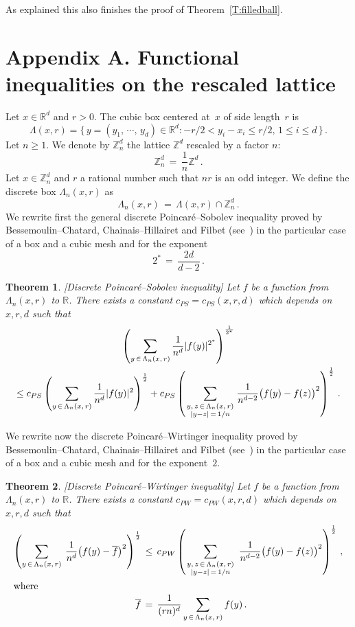 \documentclass[10pt]{amsart}
\newtheorem{theo}{Theorem}[section]
\theoremstyle{definition}\newtheorem{defi}[theo]{Definition}\newtheorem{rema}[theo]{Remark}\newtheorem{exam}[theo]{Example}\newtheorem{exem}[theo]{Example}\newtheorem{nota}[theo]{Notation}
\newcommand{\tatop}[2]{\genfrac{}{}{0pt}{1}{#1}{#2}}
\newcommand*\Z {{\mathbb Z}}
\newcommand*\Zd {{\mathbb Z^d}}
\newcommand*\Rd {{\mathbb R^d}}
\newcommand*\Znd {{\mathbb Z_n^d}}
\newcommand*\R{\mathbb{R}}
\newcommand*\baf {{\overline f}}
\newcommand*\La {{\Lambda}}
\begin{document}
As explained this also finishes the proof of Theorem~\ref{T:filledball}.



\appendix
\addtocounter{section}{1}
\section*{Appendix A. Functional inequalities on the rescaled lattice}
Let $x\in\Rd$ and $r>0$. The cubic box centered at~$x$ of side length~$r$ is
\[
\Lambda(x,r) = \big\{\,y=(y_1,\,\cdots,\,y_d)\in\R^d: -r/2<y_i-x_i\leq r/2,
\,1\leq i\leq d\,\big\}\,.
\]
Let $n\geq 1$. We denote by $\Znd$ the lattice $\Zd$ rescaled by a factor $n$:
\[
\Znd\,=\,\frac{1}{n}\Z^d\,.
\]
Let $x\in\Znd$ and $r$ a rational number such that $nr$ is an odd integer. We define the discrete box $\La_n(x,r)$ as
\[
\La_n(x,r)\,=\,\La(x,r)\cap\Znd\,.
\]
We rewrite first the general discrete Poincaré--Sobolev inequality proved by Bessemou\-lin--Chatard, Chainais--Hillairet and Filbet (see~\cite[Theorem~$3$]{BCHF}) in the particular case of a box and a cubic mesh and for the exponent
\[
2^*\,=\,\frac{2d}{d-2}\,.
\]
\begin{theo}\label{PS}[Discrete Poincaré--Sobolev inequality]
Let $f$ be a function from $\La_n(x,r)$ to $\R$. There exists a constant $c_{PS}=c_{PS}(x,r,d)$ which depends on $x,r,d$ such that
\begin{multline*}
\left(\sum_{y\,\in\,\Lambda_n(x,\,r)}\frac{1}{n^d}|f(y)|^{2^*}\right)^{\frac{1}{2^*}}
\\
\leq c_{PS}\left(\sum_{y\,\in\,\Lambda_n(x,\,r)}\frac{1}{n^d}|f(y)|^{2}\right)^{\frac{1}{2}} +c_{PS}\left(\sum_{\tatop{y,\,z\,\in\,\Lambda_n(x,\,r)}{|y-z|\,=\,1/n}}
\frac{1}{n^{d-2}}\big(f(y)-f(z)\big)^{2}\right)^{\frac{1}{2}}\,.
\end{multline*}
\end{theo}

We rewrite now the discrete Poincaré--Wirtinger inequality proved by Bessemoulin--Chatard, Chainais--Hillairet and Filbet (see~\cite[Theorem~$5$]{BCHF}) in the particular case of a box and a cubic mesh and for the exponent~$2$.
\begin{theo}\label{PW}[Discrete Poincaré--Wirtinger inequality]
Let $f$ be a function from $\La_n(x,r)$ to $\R$. There exists a constant $c_{PW}=c_{PW}(x,r,d)$ which depends on $x,r,d$ such that
\begin{align*}
\left(\sum_{y\,\in\,\Lambda_n(x,\,r)}\:\frac{1}{n^d}\big(f(y)-\baf\big)^{2}\right)^{\frac{1}{2}}
\,&\leq\, c_{PW}\left(
\sum_{\tatop{y,\,z\,\in\,\Lambda_n(x,\,r)}{|y-z|\,=\,1/n}}\:
\frac{1}{n^{d-2}}\big(f(y)-f(z)\big)^{2}\right)^{\frac{1}{2}}\,,\\
\intertext{where}
\baf\,&=\,
\frac{1}{(rn)^d}
\sum_{y\,\in\,\Lambda_n(x,\,r)}
f(y)\,.
\end{align*}
\end{theo}
\end{document}
